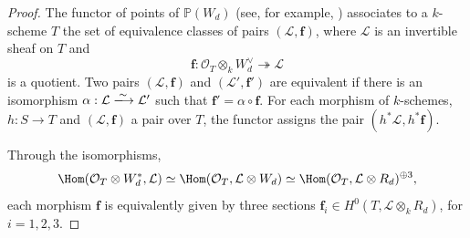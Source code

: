 \documentclass[11pt]{amsart} %
\newcommand{\lar}{\longrightarrow}
\theoremstyle{definition}
\def\NZQ{\mathbb}               %
\def\PP{{\NZQ P}}
\begin{document}
\begin{proof}
The functor of points of $\PP(W_d)$ (see, for example, \cite[Chapter II, Theorem 7.1]{hartshorne2013algebraic}) associates to a $k$-scheme $T$
the set of equivalence classes of pairs $(\mathcal L,\mathbf f)$,
where $\mathcal L$ is an invertible sheaf on $T$ and
\[
\mathbf f:
\mathcal O_T\otimes_k W_d^\vee
\twoheadrightarrow
\mathcal L
\]
is a quotient. Two pairs $(\mathcal L,\mathbf f)$ and
$(\mathcal L',\mathbf f')$ are equivalent if there is an
isomorphism $\alpha:\mathcal L\xlongrightarrow{\sim}\mathcal L'$ such that \(\mathbf f'=\alpha\circ\mathbf f.\) For each morphism of $k$-schemes, $h: S \lar T$ and $(\mathcal{L}, \textbf{f})$ a pair over $T$, the functor assigns the pair $(h^*\mathcal{L}, h^*\textbf{f})$.

Through the isomorphisms, 
$$
\Hom(\mathcal{O}_T \otimes W_d^*, \mathcal{L}) \simeq \Hom(\mathcal{O}_T, \mathcal{L} \otimes W_d) \simeq \Hom(\mathcal{O}_T, \mathcal{L} \otimes R_d)^{\oplus 3},
$$
each morphism $\mathbf f$ is
equivalently given by three sections
\(
\mathbf f_i\in H^0(T,\mathcal L\otimes_kR_d)\), for $i = 1, 2, 3$.


\end{proof}
\end{document}
